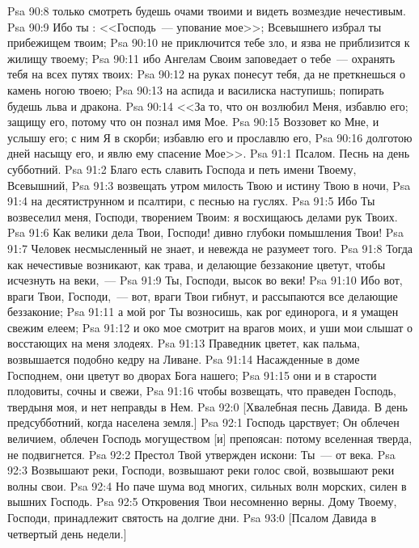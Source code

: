 \vs Psa 90:8 только смотреть будешь очами твоими и видеть возмездие нечестивым.
\vs Psa 90:9 Ибо ты : <<Господь~--- упование мое>>; Всевышнего избрал ты прибежищем твоим;
\vs Psa 90:10 не приключится тебе зло, и язва не приблизится к жилищу твоему;
\vs Psa 90:11 ибо Ангелам Своим заповедает о тебе~--- охранять тебя на всех путях твоих:
\vs Psa 90:12 на руках понесут тебя, да не преткнешься о камень ногою твоею;
\vs Psa 90:13 на аспида и василиска наступишь; попирать будешь льва и дракона.
\vs Psa 90:14 <<За то, что он возлюбил Меня, избавлю его; защищу его, потому что он познал имя Мое.
\vs Psa 90:15 Воззовет ко Мне, и услышу его; с ним Я в скорби; избавлю его и прославлю его,
\vs Psa 90:16 долготою дней насыщу его, и явлю ему спасение Мое>>.
\vs Psa 91:1 Псалом. Песнь на день субботний.
\rsbpar\vs Psa 91:2 Благо есть славить Господа и петь имени Твоему, Всевышний,
\vs Psa 91:3 возвещать утром милость Твою и истину Твою в ночи,
\vs Psa 91:4 на десятиструнном и псалтири, с песнью на гуслях.
\vs Psa 91:5 Ибо Ты возвеселил меня, Господи, творением Твоим: я восхищаюсь делами рук Твоих.
\vs Psa 91:6 Как велики дела Твои, Господи! дивно глубоки помышления Твои!
\vs Psa 91:7 Человек несмысленный не знает, и невежда не разумеет того.
\vs Psa 91:8 Тогда как нечестивые возникают, как трава, и делающие беззаконие цветут, чтобы исчезнуть на веки,~---
\vs Psa 91:9 Ты, Господи, высок во веки!
\vs Psa 91:10 Ибо вот, враги Твои, Господи,~--- вот, враги Твои гибнут, и рассыпаются все делающие беззаконие;
\vs Psa 91:11 а мой рог Ты возносишь, как рог единорога, и я умащен свежим елеем;
\vs Psa 91:12 и око мое смотрит на врагов моих, и уши мои слышат о восстающих на меня злодеях.
\vs Psa 91:13 Праведник цветет, как пальма, возвышается подобно кедру на Ливане.
\vs Psa 91:14 Насажденные в доме Господнем, они цветут во дворах Бога нашего;
\vs Psa 91:15 они и в старости плодовиты, сочны и свежи,
\vs Psa 91:16 чтобы возвещать, что праведен Господь, твердыня моя, и нет неправды в Нем.
\vs Psa 92:0 [Хвалебная песнь Давида. В день предсубботний, когда населена земля.]
\rsbpar\vs Psa 92:1 Господь царствует; Он облечен величием, облечен Господь могуществом [и] препоясан: потому вселенная тверда, не подвигнется.
\vs Psa 92:2 Престол Твой утвержден искони: Ты~--- от века.
\vs Psa 92:3 Возвышают реки, Господи, возвышают реки голос свой, возвышают реки волны свои.
\vs Psa 92:4 Но паче шума вод многих, сильных волн морских, силен в вышних Господь.
\vs Psa 92:5 Откровения Твои несомненно верны. Дому Твоему, Господи, принадлежит святость на долгие дни.
\vs Psa 93:0 [Псалом Давида в четвертый день недели.]
